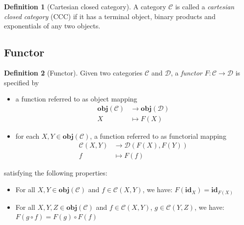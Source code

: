 \documentclass[12pt,a4paper]{report}
\theoremstyle{definition}
\newtheorem{definition}{Definition}[chapter]
\begin{document}
        \begin{definition}[Cartesian closed category]
            A category $\mathcal{C}$ is called a \emph{cartesian closed category} (CCC) if it has a terminal object, binary products and exponentials of any two objects.
        \end{definition}

        
        \subsection{Functor}
        \begin{definition}[Functor] \label{def: functor}
            Given two categories $\mathcal{C}$ and $\mathcal{D}$, a \emph{functor} $F: \mathcal{C} \to \mathcal{D}$ is specified by
            \begin{itemize}
                \item 
                    a function referred to as object mapping
                    \[\begin{aligned}
                        \textbf{obj}(\mathcal{C}) &\to \textbf{obj}(\mathcal{D}) \\
                        X &\mapsto F(X)
                    \end{aligned}\]

                \item 
                    for each $X, Y \in \textbf{obj}(\mathcal{C})$, a function referred to as functorial mapping
                    \[\begin{aligned}
                        \mathcal{C}{(X,Y)} &\to \mathcal{D}{(F(X),F(Y))} \\
                        f &\mapsto F(f)
                    \end{aligned}\]
            \end{itemize}
            satisfying the following properties:
            \begin{itemize}
                \item 
                    For all $X, Y \in \textbf{obj}(\mathcal{C})$ and $f \in \mathcal{C}{(X,Y)}$, we have: $ F(\textbf{id}_X) = \textbf{id}_{F(X)}$
                \item
                    For all $X, Y, Z \in \textbf{obj}(\mathcal{C})$ and $f \in \mathcal{C}{(X,Y)}$, $g \in \mathcal{C}{(Y,Z)}$, we have: $F(g \circ f) = F(g) \circ F(f)$
            \end{itemize}
        \end{definition}
\end{document}
